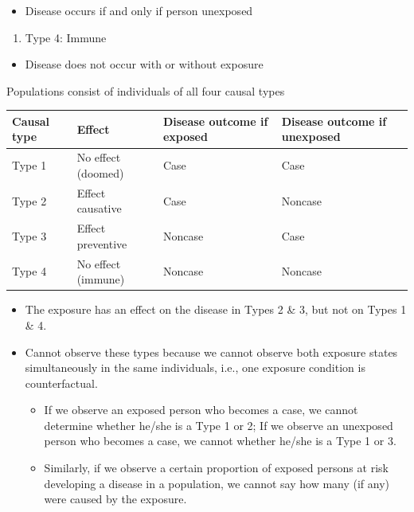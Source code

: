 \documentclass[
]{book}
\providecommand{\tightlist}{%
  \setlength{\itemsep}{0pt}\setlength{\parskip}{0pt}}
\begin{document}
\begin{itemize}
\tightlist
\item
  Disease occurs if and only if person unexposed
\end{itemize}

\begin{enumerate}
\def\labelenumi{\arabic{enumi}.}
\setcounter{enumi}{3}
\tightlist
\item
  Type 4: Immune
\end{enumerate}

\begin{itemize}
\tightlist
\item
  Disease does not occur with or without exposure
\end{itemize}

Populations consist of individuals of all four causal types

\begin{longtable}[]{@{}llll@{}}
\toprule
Causal type & Effect & Disease outcome if exposed & Disease outcome if unexposed \\
\midrule
\endhead
Type 1 & No effect (doomed) & Case & Case \\
Type 2 & Effect causative & Case & Noncase \\
Type 3 & Effect preventive & Noncase & Case \\
Type 4 & No effect (immune) & Noncase & Noncase \\
\bottomrule
\end{longtable}

\begin{itemize}
\tightlist
\item
  The exposure has an effect on the disease in Types 2 \& 3, but not on Types 1 \& 4.
\item
  Cannot observe these types because we cannot observe both exposure states simultaneously in the same individuals, i.e., one exposure condition is counterfactual.

  \begin{itemize}
  \tightlist
  \item
    If we observe an exposed person who becomes a case, we cannot determine whether he/she is a Type 1 or 2; If we observe an unexposed person who becomes a case, we cannot whether he/she is a Type 1 or 3.
  \item
    Similarly, if we observe a certain proportion of exposed persons at risk developing a disease in a population, we cannot say how many (if any) were caused by the exposure.
  \end{itemize}
\end{itemize}
\end{document}
